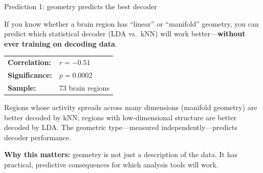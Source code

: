 \documentclass[aspectratio=169,11pt]{beamer}
\begin{document}
\begin{frame}{Prediction 1: geometry predicts the best decoder}

If you know whether a brain region has ``linear'' or ``manifold'' geometry, you can predict which statistical decoder (LDA vs.\ kNN) will work better---\textbf{without ever training on decoding data}.

\vspace{0.4em}

\begin{center}
{\small
\begin{tabular}{ll}
\textbf{Correlation:} & $r = -0.51$ \\[0.2em]
\textbf{Significance:} & $p = 0.0002$ \\[0.2em]
\textbf{Sample:} & 73 brain regions \\
\end{tabular}
}
\end{center}

\vspace{0.4em}

Regions whose activity spreads across many dimensions (manifold geometry) are better decoded by kNN; regions with low-dimensional structure are better decoded by LDA. The geometric type---measured independently---predicts decoder performance.

\vspace{0.4em}
{\small \textbf{Why this matters:} geometry is not just a description of the data. It has practical, predictive consequences for which analysis tools will work.}
\end{frame}
\end{document}
